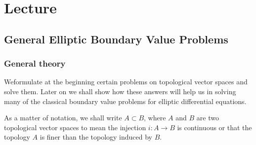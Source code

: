 
\chapter{Lecture}\label{lec5}%

\setcounter{section}{2}
\section{General Elliptic Boundary Value Problems}\label{lec5:sec3}%

\subsection{General theory}\label{lec5:sec3:subsec1}

We\pageoriginale formulate at the beginning certain problems on topological vector
spaces and solve them. Later on we shall show how these answers will
help us in solving many of the classical boundary value problems for
elliptic differential equations. 

As a matter of notation, we shall write $A \subset B$, where $A$ and
$B$ are two topological vector spaces to mean the injection $i : A
\rightarrow B$ is continuous or that the topology $A$ is finer than
the topology induced by $B$. 

